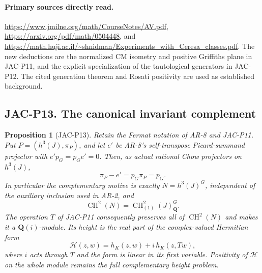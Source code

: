\documentclass[11pt,a4paper]{article}
\providecommand{\mathscr}[1]{\mathcal{#1}}
\newtheorem{proposition}[theorem]{Proposition}
\begin{document}
\paragraph{Primary sources directly read.}
\url{https://www.jmilne.org/math/CourseNotes/AV.pdf},
\url{https://arxiv.org/pdf/math/0504448}, and
\url{https://math.huji.ac.il/~shnidman/Experiments_with_Ceresa_classes.pdf}.
The new deductions are the normalized CM isometry and positive
Griffiths plane in JAC-P11, and the explicit specialization of
the tautological generators in JAC-P12. The cited generation
theorem and Rosati positivity are used as established background.


\subsection*{JAC-P13. The canonical invariant complement}

\begin{proposition}[JAC-P13]\label{jac:P13}
Retain the Fermat notation of AR-8 and JAC-P11. Put
$P=(h^3(J),\pi_P)$, and let $e'$ be AR-8's self-transpose
Picard-summand projector with $e'p_G=p_Ge'=0$.
Then, as actual rational Chow projectors on $h^3(J)$,
\[
 \pi_P-e'=p_G\pi_P=p_G.                               \tag{JAC.P13.1}
\]
In particular the complementary motive is exactly
$N=h^3(J)^G$, independent of the auxiliary inclusion used in AR-2,
and
\[
 \operatorname{CH}^2(N)
       =\operatorname{CH}^2_{(1)}(J)_{\mathbf Q}^{G}.    \tag{JAC.P13.2}
\]
The operation $T$ of JAC-P11 consequently preserves all of
$\operatorname{CH}^2(N)$ and makes it a $\mathbf Q(i)$-module.
Its height is the real part of the complex-valued Hermitian form
\[
 \mathscr H(z,w)=h_K(z,w)+i\,h_K(z,Tw),                 \tag{JAC.P13.3}
\]
where $i$ acts through $T$ and the form is linear in its first
variable. Positivity of $\mathscr H$ on the whole module remains
the full complementary height problem.
\end{proposition}
\end{document}

